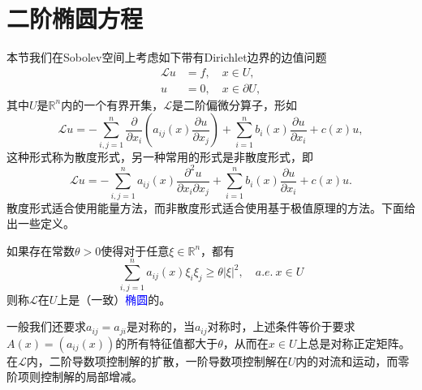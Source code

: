 \documentclass[a4paper,10pt]{ctexart}
\begin{document}
\section{二阶椭圆方程}
本节我们在Sobolev空间上考虑如下带有Dirichlet边界的边值问题
\begin{equation}\label{eq:elliptic_problem}
    \begin{aligned}
        \mathcal{L}u &= f, \quad x\in U,\\
        u &= 0, \quad x\in \partial U,
    \end{aligned}
\end{equation}
其中$ U $是$ \mathbb{R}^n $内的一个有界开集，$ \mathcal{L} $是二阶偏微分算子，形如
\begin{equation}\label{eq:elliptic}
    \mathcal{L}u = -\sum_{i,j=1}^n \dfrac{\partial}{\partial x_i} \left( a_{ij}(x) \dfrac{\partial u}{\partial x_j} \right) + \sum_{i=1}^n b_i(x) \dfrac{\partial u}{\partial x_i} + c(x)u,
\end{equation}
这种形式称为散度形式，另一种常用的形式是非散度形式，即
\begin{equation}
    \mathcal{L}u = -\sum_{i,j=1}^n a_{ij}(x) \dfrac{\partial^2 u}{\partial x_i \partial x_j} + \sum_{i=1}^n b_i(x) \dfrac{\partial u}{\partial x_i} + c(x)u.
\end{equation}
散度形式适合使用能量方法，而非散度形式适合使用基于极值原理的方法。下面给出一些定义。

\begin{definition}
    如果存在常数$ \theta > 0  $使得对于任意$ \xi\in \mathbb{R}^n $，都有
    \begin{equation}
        \sum_{i,j=1}^n a_{ij}(x)\xi_i\xi_j \geqslant \theta |\xi|^2,\quad a.e.\ x\in U
    \end{equation}
    则称$ \mathcal{L} $在$ U $上是（一致）\textcolor{blue}{椭圆}的。
\end{definition}
一般我们还要求$ a_{ij} = a_{ji} $是对称的，当$ a_{ij} $对称时，上述条件等价于要求$ A(x) = (a_{ij}(x)) $的所有特征值都大于$ \theta $，从而在$ x\in U $上总是对称正定矩阵。在$ \mathcal{L} $内，二阶导数项控制解的扩散，一阶导数项控制解在$ U $内的对流和运动，而零阶项则控制解的局部增减。
\end{document}
